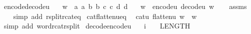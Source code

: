 \begin{isabellebody}
\endisatagproof
{\isafoldproof}%
%
\isadelimproof
\isanewline
%
\endisadelimproof
\isanewline
{}\isamarkupfalse%
\ encode{\isacharunderscore}{\kern0pt}decode{\isacharunderscore}{\kern0pt}u{}{}{\isacharcolon}{\kern0pt}\isanewline
\ \ \ {\isachardoublequoteopen}w\ {\isacharequal}{\kern0pt}\ {\isacharbrackleft}{\kern0pt}a{}{\isacharcomma}{\kern0pt}\ a{}{\isacharcomma}{\kern0pt}\ b{}{\isacharcomma}{\kern0pt}\ b{}{\isacharcomma}{\kern0pt}\ c{}{\isacharcomma}{\kern0pt}\ c{}{\isacharcomma}{\kern0pt}\ d{}{\isacharcomma}{\kern0pt}\ d{}{\isacharbrackright}{\kern0pt}{\isachardoublequoteclose}\isanewline
\ \ \ {\isachardoublequoteopen}w\ {\isacharequal}{\kern0pt}\ encode{\isacharunderscore}{\kern0pt}u{}{}\ {\isacharparenleft}{\kern0pt}decode{\isacharunderscore}{\kern0pt}u{}{}\ w{\isacharparenright}{\kern0pt}{\isachardoublequoteclose}\isanewline
%
\isadelimproof
\ \ %
\endisadelimproof
%
\isatagproof
{}\isamarkupfalse%
\ assms\ \isanewline
\ \ \isamarkupfalse%
\ {\isacharparenleft}{\kern0pt}simp\ add{\isacharcolon}{\kern0pt}\ rsplit{\isacharunderscore}{\kern0pt}rcat{\isacharunderscore}{\kern0pt}eq{\isacharparenright}{\kern0pt}%
\endisatagproof
{\isafoldproof}%
%
\isadelimproof
\isanewline
%
\endisadelimproof
\isanewline
{}\isamarkupfalse%
\ cat{\isacharunderscore}{\kern0pt}flatten{\isacharunderscore}{\kern0pt}u{}{}{\isacharunderscore}{\kern0pt}eq{\isacharcolon}{\kern0pt}\isanewline
\ \ {\isachardoublequoteopen}cat{\isacharunderscore}{\kern0pt}u{}{}\ {\isacharparenleft}{\kern0pt}flatten{\isacharunderscore}{\kern0pt}u{}{}\ w{\isacharparenright}{\kern0pt}\ {\isacharequal}{\kern0pt}\ w{\isachardoublequoteclose}\ \isanewline
%
\isadelimproof
\ \ %
\endisadelimproof
%
\isatagproof
{}\isamarkupfalse%
\ {\isacharparenleft}{\kern0pt}simp\ add{\isacharcolon}{\kern0pt}\ word{\isacharunderscore}{\kern0pt}rcat{\isacharunderscore}{\kern0pt}rsplit{\isacharparenright}{\kern0pt}%
\endisatagproof
{\isafoldproof}%
%
\isadelimproof
\isanewline
%
\endisadelimproof
\isanewline
{}\isamarkupfalse%
\ decode{\isacharunderscore}{\kern0pt}encode{\isacharunderscore}{\kern0pt}u{}{}{\isacharcolon}{\kern0pt}\isanewline
\ \ \ {\isachardoublequoteopen}i\ {\isasymle}\ {}\ {\isacharcircum}{\kern0pt}\ LENGTH{\isacharparenleft}{\kern0pt}{}{}{\isacharparenright}{\kern0pt}\ {\isacharminus}{\kern0pt}\ {}{\isachardoublequoteclose}\isanewline

\end{isabellebody}
